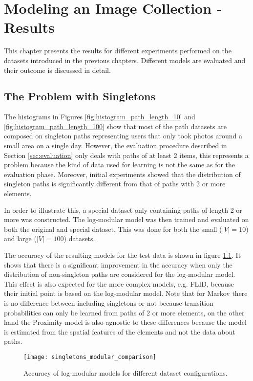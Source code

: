 \chapter{Modeling an Image Collection - Results}
\label{sec:results}

This chapter presents the results for different experiments performed on the datasets introduced in the previous chapters. Different models are evaluated and their outcome is discussed in detail.

\section{The Problem with Singletons}

The histograms in Figures \ref{fig:histogram_path_length_10} and \ref{fig:histogram_path_length_100} show that most of the path datasets are composed on singleton paths representing users that only took photos around a small area on a single day. However, the evaluation procedure described in Section \ref{sec:evaluation} only deals with paths of at least 2 items, this represents a problem because the kind of data used for learning is not the same as for the evaluation phase. Moreover, initial experiments showed that the distribution of singleton paths is significantly different from that of paths with 2 or more elements.

In order to illustrate this, a special dataset only containing paths of length 2 or more was constructed. The log-modular model was then trained and evaluated on both the original and special dataset. This was done for both the small ($|V|=10$) and large ($|V|=100$) datasets.

The accuracy of the resulting models for the test data is shown in figure \ref{fig:comparison_singletons_modular}. It shows that there is a significant improvement in the accuracy when only the distribution of non-singleton paths are considered for the log-modular model. This effect is also expected for the more complex models, e.g. FLID, because their initial point is based on the log-modular model. Note that for Markov there is no difference between including singletons or not because transition probabilities can only be learned from paths of 2 or more elements, on the other hand the Proximity model is also agnostic to these differences because the model is estimated from the spatial features of the elements and not the data about paths.

\begin{figure}
  \centering
  \texttt{[image: singletons\_modular\_comparison]}
  \caption{Accuracy of log-modular models for different dataset configurations.}
  \label{fig:comparison_singletons_modular}
\end{figure}

